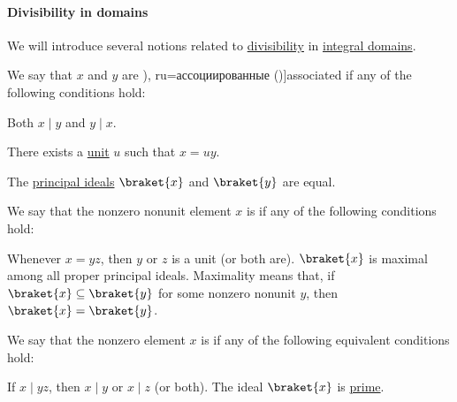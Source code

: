 \paragraph{Divisibility in domains}

\begin{definition}\label{def:domain_divisibility}
  We will introduce several notions related to \hyperref[def:divisibility]{divisibility} in \hyperref[def:integral_domain]{integral domains}.

  \begin{thmenum}
     We say that \( x \) and \( y \) are \term[bg=асоциирани (\cite[142]{ГеновМиховскиМоллов1991}), ru=ассоциированные (\cite[118]{Винберг2014})]{associated} if any of the following conditions hold:
    \begin{thmenum}
       Both \( x \mid y \) and \( y \mid x \).

       There exists a \hyperref[def:divisibility/unit]{unit} \( u \) such that \( x = uy \).

       The \hyperref[def:semiring_ideal/principal]{principal ideals} \( \braket{ x } \) and \( \braket{ y } \) are equal.
    \end{thmenum}

     We say that the nonzero nonunit element \( x \) is  if any of the following conditions hold:
    \begin{thmenum}
       Whenever \( x = yz \), then \( y \) or \( z \) is a unit (or both are).
       \( \braket{ x } \) is maximal among all proper principal ideals. Maximality means that, if \( \braket{ x } \subseteq \braket{ y } \) for some nonzero nonunit \( y \), then \( \braket{ x } = \braket{ y } \).
    \end{thmenum}

     We say that the nonzero element \( x \) is  if any of the following equivalent conditions hold:
    \begin{thmenum}
       If \( x \mid yz \), then \( x \mid y \) or \( x \mid z \) (or both).
       The ideal \( \braket{ x } \) is \hyperref[def:semiring_ideal/prime]{prime}.
    \end{thmenum}


\end{thmenum}
\end{definition}
